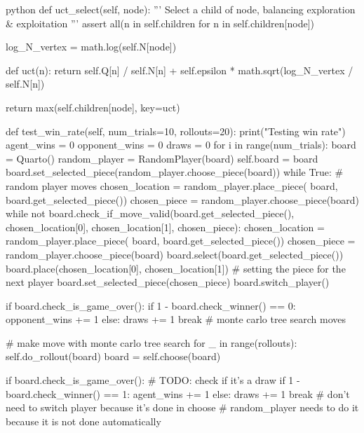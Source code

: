 \begin{mintedbox}{python}
    def uct_select(self, node):
        '''
        Select a child of node, balancing exploration & exploitation
        '''
        assert all(n in self.children for n in self.children[node])

        log_N_vertex = math.log(self.N[node])

        def uct(n):
            return self.Q[n] / self.N[n] + self.epsilon * math.sqrt(log_N_vertex / self.N[n])

        return max(self.children[node], key=uct)

    def test_win_rate(self, num_trials=10, rollouts=20):
        print("Testing win rate")
        agent_wins = 0
        opponent_wins = 0
        draws = 0
        for i in range(num_trials):
            board = Quarto()
            random_player = RandomPlayer(board)
            self.board = board
            board.set_selected_piece(random_player.choose_piece(board))
            while True:
                # random player moves
                chosen_location = random_player.place_piece(
                    board, board.get_selected_piece())
                chosen_piece = random_player.choose_piece(board)
                while not board.check_if_move_valid(board.get_selected_piece(), chosen_location[0], chosen_location[1], chosen_piece):
                    chosen_location = random_player.place_piece(
                        board, board.get_selected_piece())
                    chosen_piece = random_player.choose_piece(board)
                board.select(board.get_selected_piece())
                board.place(chosen_location[0], chosen_location[1])
                # setting the piece for the next player
                board.set_selected_piece(chosen_piece)
                board.switch_player()

                if board.check_is_game_over():
                    if 1 - board.check_winner() == 0:
                        opponent_wins += 1
                    else:
                        draws += 1
                    break
                # monte carlo tree search moves

                # make move with monte carlo tree search
                for _ in range(rollouts):
                    self.do_rollout(board)
                board = self.choose(board)

                if board.check_is_game_over():
                    # TODO: check if it's a draw
                    if 1 - board.check_winner() == 1:
                        agent_wins += 1
                    else:
                        draws += 1
                    break
                # don't need to switch player because it's done in choose
                # random_player needs to do it because it is not done automatically


\end{mintedbox}
